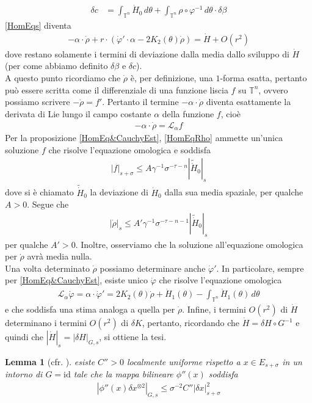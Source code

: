 \documentclass[twoside, 11pt]{amsbook}
\makeatletter
\newcommand{\0}{{(0)}}
\newcommand{\3}{{(3)}}
\theoremstyle{colonplain}
\newtheorem{lemma}[thm]{Lemma}
\theoremstyle{colondefinition}
\theoremstyle{colonremark}
\numberwithin{equation}{chapter}
\renewcommand{\proofname}{Dimostrazione}
\renewenvironment{proof}[1][\proofname]{\par
  \pushQED{\qed}%
  \normalfont \topsep6\p@\@plus6\p@\relax
  \trivlist
  \item[\hskip\labelsep\bfseries #1:]\ignorespaces
}{%
  \popQED\endtrivlist\@endpefalse
}
\makeatother
\begin{document}
\begin{proof}
\begin{align}
    \delta c &= \int_{\mathbb{T}^n} \dot{H}_0 \, d\theta + \int_{\mathbb{T}^n} \rho \circ \varphi^{-1} \, d\theta \cdot \delta\beta
\end{align}
\eqref{HomEqs} diventa
\begin{align}
    -\alpha \cdot \dot{\rho} + r \cdot (\dot{\varphi}' \cdot \alpha - 2K_2(\theta)\dot{\rho}) = \dot{H} + O(r^2)
\end{align}
dove restano solamente i termini di deviazione dalla media dallo sviluppo di $\dot{H}$ (per come abbiamo definito $\delta\beta$ e $\delta c$). \\
A questo punto ricordiamo che $\dot{\rho}$ è, per definizione, una $1$-forma esatta, pertanto può essere scritta come il differenziale di una funzione liscia $f$ su $\mathbb{T}^n$, ovvero possiamo scrivere $-\dot{\rho} = f'$. Pertanto il termine $-\alpha \cdot \dot{\rho}$ diventa esattamente la derivata di Lie lungo il campo costante $\alpha$ della funzione $f$, cioè
\begin{align}\label{HomEqRho}
    -\alpha \cdot \dot{\rho} = \mathcal{L}_\alpha f
\end{align}
Per la proposizione \ref{HomEq&CauchyEst}, \eqref{HomEqRho} ammette un'unica soluzione $f$ che risolve l'equazione omologica e soddisfa
\begin{align}
    |f|_{s + \sigma} \leq A\gamma^{-1}\sigma^{-\tau - n}|\widetilde{\dot{H}}_0|_s
\end{align}
dove si è chiamato $\widetilde{\dot{H}}_0$ la deviazione di $\dot{H}_0$ dalla sua media spaziale, per qualche $A > 0$. Segue che
\begin{align}
    |\dot{\rho}|_s \leq A'\gamma^{-1}\sigma^{-\tau - n - 1}|\widetilde{\dot{H}}_0|_s
\end{align}
per qualche $A' > 0$. Inoltre, osserviamo che la soluzione all'equazione omologica per $\dot{\rho}$ avrà media nulla. \\
Una volta determinato $\dot{\rho}$ possiamo determinare anche $\dot{\varphi}'$. In particolare, sempre per \eqref{HomEq&CauchyEst}, esiste unico $\dot{\varphi}$ che risolve l'equazione omologica
\begin{align}
    \mathcal{L}_\alpha\dot{\varphi} = \alpha \cdot \dot{\varphi}' = 2K_2(\theta)\dot{\rho} + \dot{H}_1(\theta) - \int_{\mathbb{T}^n} \dot{H}_1(\theta) \, d\theta
\end{align}
e che soddisfa una stima analoga a quella per $\dot{\rho}$. Infine, i termini $O(r^2)$ di $\dot{H}$ determinano i termini $O(r^2)$ di $\delta K$, pertanto, ricordando che $\dot{H} = \delta H \circ G^{-1}$ e quindi che $|\dot{H}|_s = |\delta H|_{G, s}$, si ottiene la tesi.
\end{proof}
\begin{lemma}[cfr. \cite{Massetti}] esiste $C'' > 0$ localmente uniforme rispetto a $x \in E_{s + \sigma}$ in un intorno di $G = \mathrm{id}$ tale che la mappa bilineare $\phi''(x)$ soddisfa
\begin{align}
    |\phi''(x)\delta x^{\otimes 2}|_{G, s} \leq \sigma^{-2}C''|\delta x|^2_{s + \sigma}
\end{align}
\end{lemma}
\end{document}
